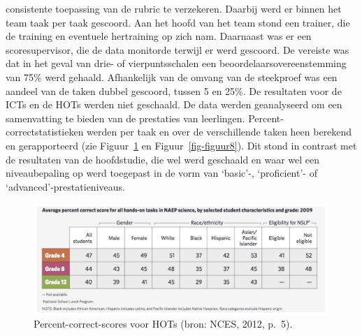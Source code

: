 \documentclass[
  letterpaper,
]{report}
\begin{document}
consistente toepassing van de rubric te verzekeren. Daarbij werd er
binnen het team taak per taak gescoord. Aan het hoofd van het team stond
een trainer, die de training en eventuele hertraining op zich nam.
Daarnaast was er een scoresupervisor, die de data monitorde terwijl er
werd gescoord. De vereiste was dat in het geval van drie- of
vierpuntsschalen een beoordelaarsovereenstemming van 75\% werd gehaald.
Afhankelijk van de omvang van de steekproef was een aandeel van de taken
dubbel gescoord, tussen 5 en 25\%. De resultaten voor de ICTs en de HOTs
werden niet geschaald. De data werden geanalyseerd om een samenvatting
te bieden van de prestaties van leerlingen. Percent-correctstatistieken
werden per taak en over de verschillende taken heen berekend en
gerapporteerd (zie Figuur~\ref{fig-figuur7} en
Figuur~\ref{fig-figuur8}). Dit stond in contrast met de resultaten van
de hoofdstudie, die wel werd geschaald en waar wel een niveaubepaling op
werd toegepast in de vorm van `basic'-, `proficient'- of
`advanced'-prestatieniveaus.

\begin{figure}

{\centering \includegraphics{./FIG7.jpg}

}

\caption{\label{fig-figuur7}Percent-correct-scores voor HOTs (bron:
NCES, 2012, p.~5).}

\end{figure}
\end{document}
